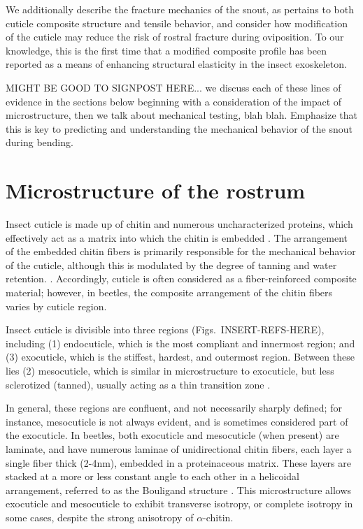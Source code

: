 \documentclass[twocolumn, linenumbers, superscriptaddress]{revtex4-1}
\begin{document}
	We additionally describe the fracture mechanics of the snout, as pertains to both cuticle composite structure and tensile behavior, and consider how modification of the cuticle may reduce the risk of rostral fracture during oviposition.
	To our knowledge, this is the first time that a modified composite profile has been reported as a means of enhancing structural elasticity in the insect exoskeleton.

	MIGHT BE GOOD TO SIGNPOST HERE... we discuss each of these lines of evidence in the sections below beginning with a consideration of the impact of microstructure, then we talk about mechanical testing, blah blah. Emphasize that this is key to predicting and understanding the mechanical behavior of the snout during bending.
	
	\section{Microstructure of the rostrum}\label{sec:microstructure}
		Insect cuticle is made up of chitin and numerous uncharacterized proteins, which effectively act as a matrix into which the chitin is embedded \cite{Nikolov2011,Nikolov2010,Vincent2004}.
		The arrangement of the embedded chitin fibers is primarily responsible for the mechanical behavior of the cuticle, although this is modulated by the degree of tanning and water retention. \cite{Klocke2011,Vincent2004}.	
		Accordingly, cuticle is often considered as a fiber-reinforced composite material; however, in beetles, the composite arrangement of the chitin fibers varies by cuticle region.	
	
		Insect cuticle is divisible into three regions (Figs.~INSERT-REFS-HERE), including (1) endocuticle, which is the most compliant and innermost region; and (3) exocuticle, which is the stiffest, hardest, and outermost region.
		Between these lies (2) mesocuticle, which is similar in microstructure to exocuticle, but less sclerotized (tanned), usually acting as a thin transition zone \cite{Klocke2011,Vincent1982,Vincent2004}.
		
		In general, these regions are confluent, and not necessarily sharply defined; for instance, mesocuticle is not always evident, and is sometimes considered part of the exocuticle.
		In beetles, both exocuticle and mesocuticle (when present) are laminate, and have numerous laminae of unidirectional chitin fibers, each layer a single fiber thick (2-4nm), embedded in a proteinaceous matrix.
		These layers are stacked at a more or less constant angle to each other in a helicoidal arrangement, referred to as the Bouligand structure \cite{Blackwell1980,Bouligand1972,Neville1976}. 
		This microstructure allows exocuticle and mesocuticle to exhibit transverse isotropy, or complete isotropy in some cases, despite the strong anisotropy of $\alpha$-chitin.
		
\end{document}
